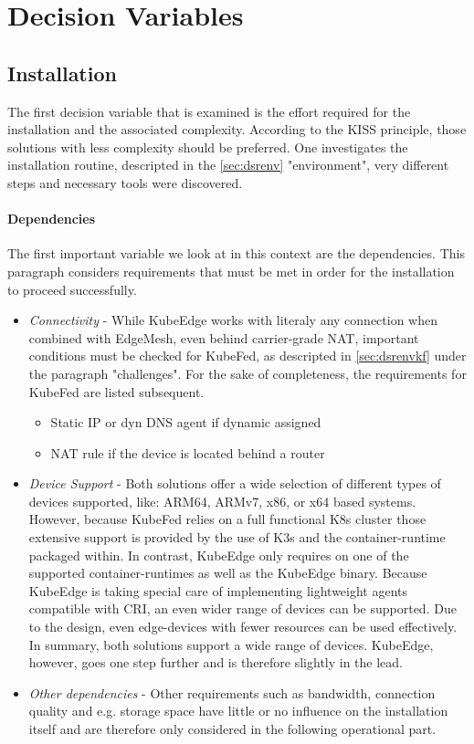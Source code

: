 \documentclass[MSC,Master,english]{twbook}%
\begin{document}
\section{Decision Variables}
\label{sec:variables}
\subsection{Installation}
The first decision variable that is examined is the effort required for the installation and the associated complexity. According to the KISS principle\cite{kiss}, those solutions with less complexity should be preferred. One investigates the installation routine, descripted in the \autoref{sec:dsrenv} "environment", very different steps and necessary tools were discovered. 
\paragraph{Dependencies} The first important variable we look at in this context are the dependencies. This paragraph considers requirements that must be met in order for the installation to proceed successfully.

\begin{itemize}
    \item \textit{Connectivity} - While KubeEdge works with literaly any connection when combined with EdgeMesh, even behind carrier-grade \ac{NAT}\cite{cg-nat}, important conditions must be checked for KubeFed, as descripted in \autoref{sec:dsrenvkf} under the paragraph "challenges". For the sake of completeness, the requirements for KubeFed are listed subsequent.
    \begin{itemize}
        \item Static \ac{IP} or dyn \ac{DNS} agent if dynamic assigned
        \item \ac{NAT} rule if the device is located behind a router
    \end{itemize}
    \item \textit{Device Support} - Both solutions offer a wide selection of different types of devices supported, like: ARM64, ARMv7, x86, or x64 based systems. However, because \ac{KubeFed} relies on a full functional \ac{K8s} cluster those extensive support is provided by the use of K3s and the container-runtime packaged within. In contrast, KubeEdge only requires on one of the supported container-runtimes as well as the KubeEdge binary. Because KubeEdge is taking special care of implementing lightweight agents compatible with \ac{CRI}\cite{k8scri}\cite{ke-cri-gh}, an even wider range of devices can be supported. Due to the design, even edge-devices with fewer resources can be used effectively. In summary, both solutions support a wide range of devices. KubeEdge, however, goes one step further and is therefore slightly in the lead.
    \item \textit{Other dependencies} - Other requirements such as bandwidth, connection quality and e.g. storage space have little or no influence on the installation itself and are therefore only considered in the following operational part.
\end{itemize}
\end{document}
